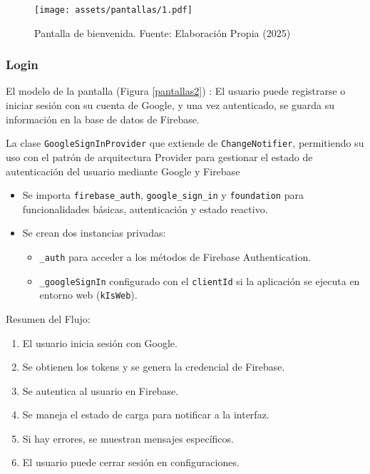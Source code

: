 \begin{figure}[h!]
\centering
  \texttt{[image: assets/pantallas/1.pdf]}
  \caption{Pantalla de bienvenida. Fuente: Elaboración Propia (2025)}
  \label{pantallas1}
\end{figure}

\newpage
\subsubsection*{Login}
El modelo de la pantalla (Figura \ref{pantallas2})%
: El usuario puede registrarse o iniciar sesión con su cuenta de Google, y una vez autenticado, se guarda su información en la base de datos de Firebase.


La clase \texttt{GoogleSignInProvider} que extiende de \texttt{ChangeNotifier}, permitiendo su uso con el patrón de arquitectura Provider para gestionar el estado de autenticación del usuario mediante Google y Firebase

\begin{itemize}
    \item Se importa \texttt{firebase\_auth}, \texttt{google\_sign\_in} y \texttt{foundation} para funcionalidades básicas, autenticación y estado reactivo.
    \item Se crean dos instancias privadas:
    \begin{itemize}
        \item \texttt{\_auth} para acceder a los métodos de Firebase Authentication.
        \item \texttt{\_googleSignIn} configurado con el \texttt{clientId} si la aplicación se ejecuta en entorno web (\texttt{kIsWeb}).
    \end{itemize}
\end{itemize}


Resumen del Flujo:

\begin{enumerate}
    \item El usuario inicia sesión con Google.
    \item Se obtienen los tokens y se genera la credencial de Firebase.
    \item Se autentica al usuario en Firebase.
    \item Se maneja el estado de carga para notificar a la interfaz.
    \item Si hay errores, se muestran mensajes específicos.
    \item El usuario puede cerrar sesión en configuraciones.
\end{enumerate}


